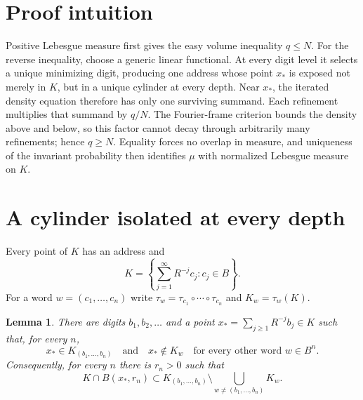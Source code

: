 \documentclass[11pt]{article}
\newtheorem{lemma}{Lemma}
\begin{document}
\section{Proof intuition}

Positive Lebesgue measure first gives the easy volume inequality $q\leq N$.
For the reverse inequality, choose a generic linear functional.  At every
digit level it selects a unique minimizing digit, producing one address
whose point $x_*$ is exposed not merely in $K$, but in a unique cylinder at
every depth.  Near $x_*$, the iterated density equation therefore has only
one surviving summand.  Each refinement multiplies that summand by $q/N$.
The Fourier-frame criterion bounds the density above and below, so this
factor cannot decay through arbitrarily many refinements; hence $q\geq N$.
Equality forces no overlap in measure, and uniqueness of the invariant
probability then identifies $\mu$ with normalized Lebesgue measure on $K$.

\section{A cylinder isolated at every depth}

Every point of $K$ has an address and
\begin{equation}\label{eq:address}
 K=\left\{\sum_{j=1}^{\infty}R^{-j}c_j:c_j\in B\right\}.
\end{equation}
For a word $w=(c_1,\ldots,c_n)$ write
$\tau_w=\tau_{c_1}\circ\cdots\circ\tau_{c_n}$ and
$K_w=\tau_w(K)$.

\begin{lemma}\label{lem:exposed}
There are digits $b_1,b_2,\ldots$ and a point
$x_*=\sum_{j\geq1}R^{-j}b_j\in K$ such that, for every $n$,
\[
 x_*\in K_{(b_1,\ldots,b_n)}
 \quad\text{and}\quad
 x_*\notin K_w\quad\text{for every other word }w\in B^n.
\]
Consequently, for every $n$ there is $r_n>0$ such that
\begin{equation}\label{eq:isolation}
 K\cap B(x_*,r_n)\subset K_{(b_1,\ldots,b_n)}
 \setminus\bigcup_{w\ne(b_1,\ldots,b_n)}K_w.
\end{equation}
\end{lemma}
\end{document}
